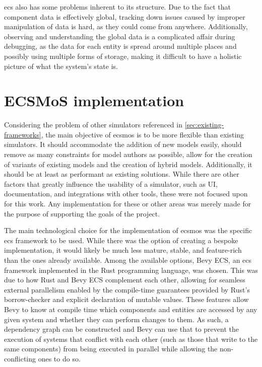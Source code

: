 \documentclass[twoside, 11pt]{article}
\begin{document}
\gls{ecs} also has some problems inherent to its structure. Due to the fact that component data is effectively global, tracking down issues caused by improper manipulation of data is hard, as they could come from anywhere. Additionally, observing and understanding the global data is a complicated affair during debugging, as the data for each entity is spread around multiple places and possibly using multiple forms of storage, making it difficult to have a holistic picture of what the system's state is.


\section{ECSMoS implementation} \label{sec:ecsmos-implementation}

Considering the problem of other simulators referenced in \autoref{sec:existing-frameworks}, the main objective of \gls{ecsmos} is to be more flexible than existing simulators. It should accommodate the addition of new models easily, should remove as many constraints for model authors as possible, allow for the creation of variants of existing models and the creation of hybrid models. Additionally, it should be at least as performant as existing solutions. While there are other factors that greatly influence the usability of a simulator, such as UI, documentation, and integrations with other tools, these were not focused upon for this work. Any implementation for these or other areas was merely made for the purpose of supporting the goals of the project.

The main technological choice for the implementation of \gls{ecsmos} was the specific \gls{ecs} framework to be used. While there was the option of creating a bespoke implementation, it would likely be much less mature, stable, and feature-rich than the ones already available. Among the available options, Bevy ECS, an \gls{ecs} framework implemented in the Rust programming language, was chosen. This was due to how Rust and Bevy ECS complement each other, allowing for seamless external parallelism enabled by the compile-time guarantees provided by Rust's borrow-checker and explicit declaration of mutable values. These features allow Bevy to know at compile time which components and entities are accessed by any given system and whether they can perform changes to them. As such, a dependency graph can be constructed and Bevy can use that to prevent the execution of systems that conflict with each other (such as those that write to the same components) from being executed in parallel while allowing the non-conflicting ones to do so.
\end{document}
